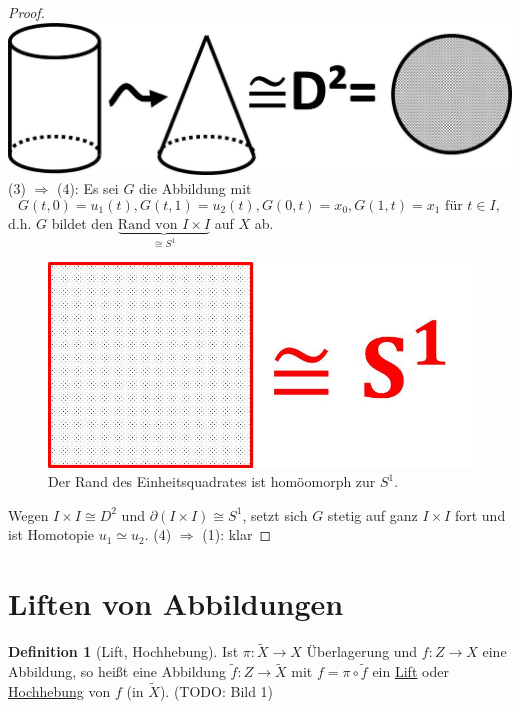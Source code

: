 \documentclass[a4paper,11pt,notitlepage]{report}
\theoremstyle{remark}
\theoremstyle{definition}
\newtheorem{definition}{Definition}[chapter]
\begin{document}
\begin{proof}
	\includegraphics[scale=0.4]{images/Zylinder_nach_D2.jpg}
	\newline
	(3) $\Rightarrow$ (4): Es sei $G$ die Abbildung mit 
	$$G(t,0) = u_1(t), G(t,1)=u_2(t), G(0,t) = x_0, G(1,t)=x_1 \text{ für } t \in I,$$
	d.h. $G$ bildet den $\underbrace{\text{Rand von }I \times I}_{\cong S^1}$ auf $X$ ab.
	\begin{figure}[h]
		\centering
		\includegraphics[scale=0.4]{images/Rand_I2_S1.jpg}
		\caption{Der Rand des Einheitsquadrates ist homöomorph zur $S^1$.}
	\end{figure}	
	\newline
	Wegen $I \times I \cong D^2$ und $\partial(I \times I) \cong S^1$, setzt sich $G$ stetig auf ganz $I \times I$ fort und ist Homotopie $u_1 \simeq u_2$.
	\newline
	(4) $\Rightarrow$ (1): klar
\end{proof}


\newpage
\section{Liften von Abbildungen}

\begin{definition}[Lift, Hochhebung]
	Ist $\pi \colon \widetilde{X} \rightarrow X$ Überlagerung und $f \colon Z \rightarrow X$ eine Abbildung, so heißt eine Abbildung $\widetilde{f} \colon Z \rightarrow \widetilde{X}$ mit $f = \pi \circ \widetilde{f}$ ein \underline{Lift} oder \underline{Hochhebung} von $f$ (in $\widetilde{X}$).
	(TODO: Bild 1)
\end{definition}
\end{document}
